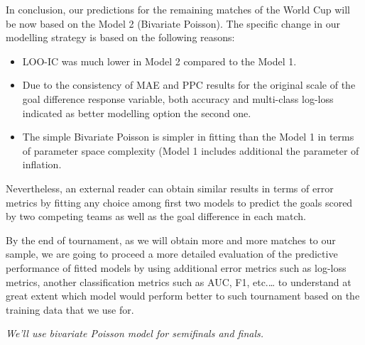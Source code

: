 \documentclass[
  10pt,
]{article}
\begin{document}
In conclusion, our predictions for the remaining matches of the World Cup will be now based on the Model 2 (Bivariate Poisson). The specific change in our modelling strategy is based on the following reasons:
\begin{itemize}
\item	LOO-IC was much lower in Model 2 compared to the Model 1.
\item Due to the consistency of MAE and PPC results for the original scale of the goal difference response variable, both accuracy and multi-class log-loss indicated as better modelling option the second one.
\item The simple Bivariate Poisson is simpler in fitting than the Model 1 in terms of parameter space complexity (Model 1 includes additional the parameter of inflation.
\end{itemize}

 Nevertheless, an external reader can obtain similar results in terms of error metrics by fitting any choice among first two models to predict the goals scored by two competing teams as well as the goal difference in each match.

By the end of tournament, as we will obtain more and more matches to our sample, we are going to proceed a more detailed evaluation of the predictive performance of fitted models by using additional error metrics such as log-loss metrics, another classification metrics such as AUC, F1, etc.… to understand at great extent which model would perform better to such tournament based on the training data that we use for.

\emph{We'll use bivariate Poisson model for semifinals and finals.}
\end{document}

